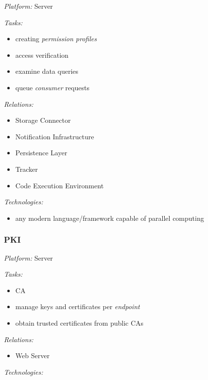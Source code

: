 \documentclass[12pt,english,a4paper,titlepage,cleardoublepage=empty,dottedtoc]{report}
\providecommand{\tightlist}{%
  \setlength{\itemsep}{0pt}\setlength{\parskip}{0pt}}
\begin{document}
\emph{Platform:} Server

\emph{Tasks:}

\begin{itemize}
\tightlist
\item
  creating \emph{permission profiles}
\item
  access verification
\item
  examine data queries
\item
  queue \emph{consumer} requests
\end{itemize}

\emph{Relations:}

\begin{itemize}
\tightlist
\item
  Storage Connector
\item
  Notification Infrastructure
\item
  Persistence Layer
\item
  Tracker
\item
  Code Execution Environment
\end{itemize}

\emph{Technologies:}

\begin{itemize}
\tightlist
\item
  any modern language/framework capable of parallel computing
\end{itemize}

\subsubsection*{PKI}\label{pki}

\emph{Platform:} Server

\emph{Tasks:}

\begin{itemize}
\tightlist
\item
  CA
\item
  manage keys and certificates per \emph{endpoint}
\item
  obtain trusted certificates from public CAs
\end{itemize}

\emph{Relations:}

\begin{itemize}
\tightlist
\item
  Web Server
\end{itemize}

\emph{Technologies:}
\end{document}
